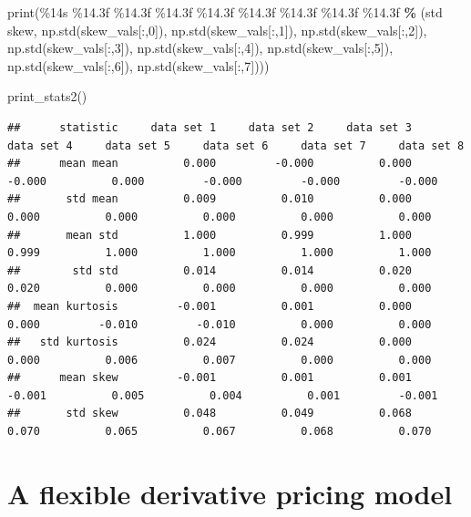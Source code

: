 \documentclass[
]{book}
\newenvironment{Shaded}{\begin{snugshade}}{\end{snugshade}}
\newcommand{\BuiltInTok}[1]{#1}
\newcommand{\DecValTok}[1]{\textcolor[rgb]{0.00,0.00,0.81}{#1}}
\newcommand{\NormalTok}[1]{#1}
\newcommand{\OperatorTok}[1]{\textcolor[rgb]{0.81,0.36,0.00}{\textbf{#1}}}
\newcommand{\SpecialCharTok}[1]{\textcolor[rgb]{0.00,0.00,0.00}{#1}}
\newcommand{\StringTok}[1]{\textcolor[rgb]{0.31,0.60,0.02}{#1}}
\begin{document}
\begin{Shaded}
\begin{Highlighting}[]
  \BuiltInTok{print}\NormalTok{(}\StringTok{\textquotesingle{}}\SpecialCharTok{\%14s}\StringTok{ }\SpecialCharTok{\%14.3f}\StringTok{ }\SpecialCharTok{\%14.3f}\StringTok{ }\SpecialCharTok{\%14.3f}\StringTok{ }\SpecialCharTok{\%14.3f}\StringTok{ }\SpecialCharTok{\%14.3f}\StringTok{ }\SpecialCharTok{\%14.3f}\StringTok{ }\SpecialCharTok{\%14.3f}\StringTok{ }\SpecialCharTok{\%14.3f}\StringTok{\textquotesingle{}} \OperatorTok{\%}\NormalTok{ (}\StringTok{\textquotesingle{}std skew\textquotesingle{}}\NormalTok{, np.std(skew\_vals[:,}\DecValTok{0}\NormalTok{]), np.std(skew\_vals[:,}\DecValTok{1}\NormalTok{]), np.std(skew\_vals[:,}\DecValTok{2}\NormalTok{]), np.std(skew\_vals[:,}\DecValTok{3}\NormalTok{]), np.std(skew\_vals[:,}\DecValTok{4}\NormalTok{]), np.std(skew\_vals[:,}\DecValTok{5}\NormalTok{]), np.std(skew\_vals[:,}\DecValTok{6}\NormalTok{]), np.std(skew\_vals[:,}\DecValTok{7}\NormalTok{])))}
  
\NormalTok{print\_stats2()  }
\end{Highlighting}
\end{Shaded}

\begin{verbatim}
##      statistic     data set 1     data set 2     data set 3     data set 4     data set 5     data set 6     data set 7     data set 8
##      mean mean          0.000         -0.000          0.000         -0.000          0.000         -0.000         -0.000         -0.000
##       std mean          0.009          0.010          0.000          0.000          0.000          0.000          0.000          0.000
##       mean std          1.000          0.999          1.000          0.999          1.000          1.000          1.000          1.000
##        std std          0.014          0.014          0.020          0.020          0.000          0.000          0.000          0.000
##  mean kurtosis         -0.001          0.001          0.000          0.000         -0.010         -0.010          0.000          0.000
##   std kurtosis          0.024          0.024          0.000          0.000          0.006          0.007          0.000          0.000
##      mean skew         -0.001          0.001          0.001         -0.001          0.005          0.004          0.001         -0.001
##       std skew          0.048          0.049          0.068          0.070          0.065          0.067          0.068          0.070
\end{verbatim}

\hypertarget{a-flexible-derivative-pricing-model}{%
\chapter{A flexible derivative pricing model}\label{a-flexible-derivative-pricing-model}}
\end{document}
